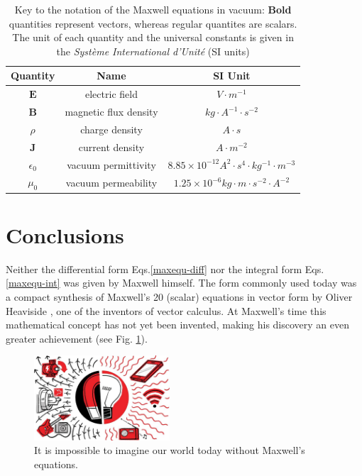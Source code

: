 \documentclass[11pt,oneside,a4paper]{article}
\begin{document}
\begin{table}[htbp!]
\begin{center}
\begin{tabular}{|c|c|c|}
\hline
Quantity & Name & SI Unit\\
\hline
$\mathbf{E}$ & electric field & $V \cdot m^{-1}$\\
\hline
$\mathbf{B}$ & magnetic flux density & $kg \cdot  A^{-1} \cdot s^{-2}$\\
\hline
$\rho$ & charge density & $A \cdot s$\\
\hline
$\mathbf{J}$ & current density & $A \cdot m^{-2}$\\
\hline
$\epsilon_0$ & vacuum permittivity & $8.85 \times 10^{-12} A^2 \cdot s^4 \cdot kg^{-1} \cdot m^{-3}$\\
\hline
$\mu_0$ & vacuum permeability & $1.25 \times 10^{-6} kg \cdot m \cdot s^{-2} \cdot A^{-2}$\\
\hline
\end{tabular}
\caption{Key to the notation of the Maxwell equations in vacuum: {\bf Bold} quantities represent vectors, whereas regular quantites are scalars. The unit of each quantity and the universal constants is given in the \textit{Syst\`eme International d'Unit\'e} (SI units)}
\end{center}
\end{table}

\section{Conclusions}

Neither the differential form Eqs.\ref{maxequ-diff} nor the integral form Eqs. \ref{maxequ-int} was given by Maxwell himself. The form commonly used today was a compact synthesis of Maxwell's 20 (scalar) equations in vector form by Oliver Heaviside \cite{heaviside}, one of the inventors of vector calculus. At Maxwell's time this mathematical concept has not yet been invented, making his discovery an even greater achievement (see Fig. \ref{me-modern-world}). 

\begin{figure}[htbp!]
\begin{center}
\includegraphics[width=0.45\textwidth]{maxwells-equations.jpg}
\caption{It is impossible to imagine our world today without Maxwell's equations.}\label{me-modern-world}
\end{center}
\end{figure}
\end{document}
